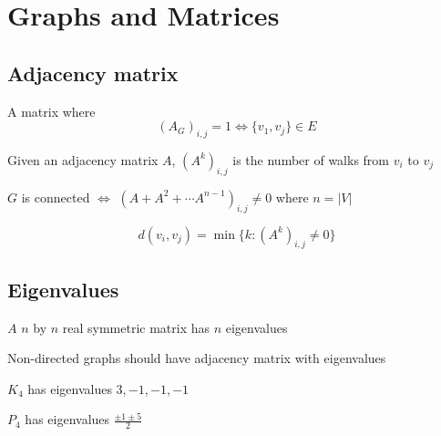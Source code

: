 
\section{Graphs and Matrices}

\subsection{Adjacency matrix}

\begin{definition}
    \label{def:adjacency matrix}
    A matrix where
    \[
        (A_G)_{i,j} = 1 \iff \{v_1, v_j\} \in E
    \]
\end{definition}  

\begin{lemma}
    Given an adjacency matrix \(A\), \((A^k)_{i,j}\) is the number of walks from \(v_i\) to \(v_j\) 
\end{lemma}

\begin{corollary}
    \(G\) is connected \(\iff\)	\((A + A^2 + \cdots A^{n-1})_{i,j} \neq 0\) where \(n = |V|\) 
\end{corollary}

\begin{definition}[diameter]
    \label{def:diameter}
    \[
        d(v_i, v_j) = \min \{k : (A^k)_{i,j} \neq 0\}
    \]
\end{definition}

\subsection{Eigenvalues}

\begin{theorem}[Spectral]
    \label{thm:spectral}
    \(A\) \(n\) by \(n\) real symmetric matrix has \(n\) eigenvalues 
\end{theorem}
\begin{corollary}
    Non-directed graphs should have adjacency matrix with eigenvalues	
\end{corollary}

\begin{example}
    \(K_4\) has eigenvalues \(3,-1, -1, -1\) 
\end{example}

\begin{example}
    \(P_4\) has eigenvalues \(\frac{\pm 1 \pm 5}{2}\) 
\end{example}

